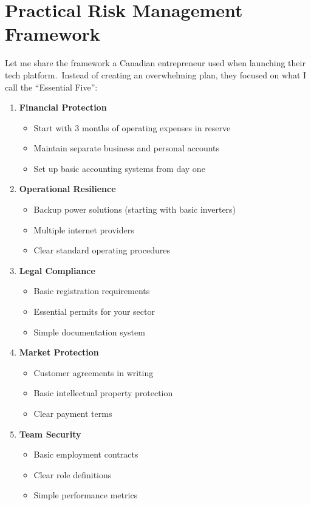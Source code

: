 \section{Practical Risk Management Framework}\label{sec:practical-risk-management}

Let me share the framework a Canadian entrepreneur used when launching their tech platform.\ Instead of creating an overwhelming plan, they focused on what I call the ``Essential Five'':

\begin{enumerate}
    \item \textbf{Financial Protection}
    \begin{itemize}
        \item Start with 3 months of operating expenses in reserve
        \item Maintain separate business and personal accounts
        \item Set up basic accounting systems from day one
    \end{itemize}

    \item \textbf{Operational Resilience}
    \begin{itemize}
        \item Backup power solutions (starting with basic inverters)
        \item Multiple internet providers
        \item Clear standard operating procedures
    \end{itemize}

    \item \textbf{Legal Compliance}
    \begin{itemize}
        \item Basic registration requirements
        \item Essential permits for your sector
        \item Simple documentation system
    \end{itemize}

    \item \textbf{Market Protection}
    \begin{itemize}
        \item Customer agreements in writing
        \item Basic intellectual property protection
        \item Clear payment terms
    \end{itemize}

    \item \textbf{Team Security}
    \begin{itemize}
        \item Basic employment contracts
        \item Clear role definitions
        \item Simple performance metrics
    \end{itemize}
\end{enumerate}


